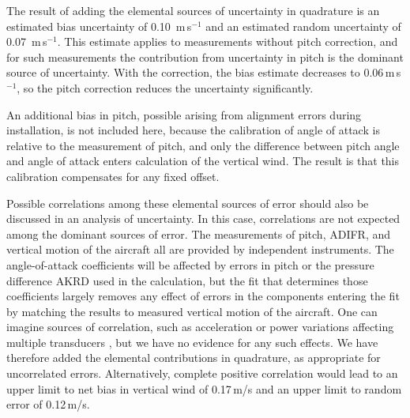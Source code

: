 \documentclass[12pt,twoside,english]{article}\usepackage[]{graphicx}\usepackage[]{color}
\let\OrgIndex\index
\renewcommand*{\index}[1]{\OrgIndex{#1}}
\providecommand{\DIFaddbegin}{} %
\providecommand{\DIFaddend}{} %
\providecommand{\DIFdelbegin}{} %
\providecommand{\DIFdelend}{} %
\begin{document}
{{The result of adding the elemental sources of uncertainty\DIFdelbegin %
\DIFdelend \DIFaddbegin {} \DIFaddend in quadrature is an estimated bias uncertainty of %
0.10~m\,s$^{-1}$ and an estimated random uncertainty of %
0.07~m\,s$^{-1}$. This estimate applies to measurements without pitch correction, and for such measurements the contribution from uncertainty in pitch is the dominant source of uncertainty. With the correction, the bias estimate decreases to 0.06\,m\,s$^{-1}$, so the pitch correction reduces the uncertainty significantly. 

An additional bias in pitch, possible arising from alignment errors during installation, is not included here, because the calibration of angle of attack is relative to the measurement of pitch, and only the difference between pitch angle and angle of attack enters calculation of the vertical wind. The result is that this calibration compensates for any fixed offset.

Possible correlations among these elemental sources of error should also be discussed in an analysis of uncertainty. In this case, correlations are not expected among the dominant sources of error. The measurements of pitch, ADIFR, and vertical motion of the aircraft all are provided by independent instruments. The angle-of-attack coefficients will be affected by errors in pitch or the pressure difference AKRD used in the calculation, but the fit that determines those coefficients largely removes any effect of errors in the components entering the fit by matching the results to measured vertical motion of the aircraft. One can imagine sources of correlation, such as acceleration or power variations affecting multiple transducers , but we have no evidence for any such effects. We have therefore added the elemental contributions in quadrature, as appropriate for uncorrelated errors. Alternatively, complete positive correlation would lead to an upper limit to net bias in vertical wind of 0.17\,m/s and an upper limit to random error of 0.12\,m/s. 

}}
\end{document}
